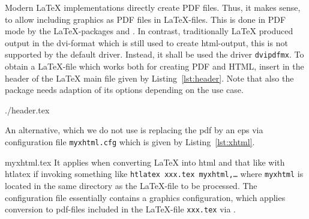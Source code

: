 Modern \LaTeX{} implementations directly create PDF files. 
Thus, it makes sense, 
to allow including graphics as PDF files in \LaTeX-files. 
This is done in PDF mode 
by the \LaTeX-packages  and . 
In contrast, traditionally \LaTeX{} produced output in the \gls{dvi}-format 
which is still used to create \gls{html}-output, 
this is not supported by the default driver. 
Instead, it shall be used the driver \texttt{dvipdfmx}. 
To obtain a \LaTeX-file which works both for creating PDF and HTML, 
insert in the header of the \LaTeX{} main file
given by Listing~\ref{lst:header}. 
Note that also the package  needs adaption of its options 
depending on the use case. 
%

%
%
{./header.tex}%


An alternative, which we do not use 
is replacing the \gls{pdf} by an \gls{eps} via configuration file \texttt{myxhtml.cfg} 
which is given by Listing~\ref{lst:xhtml}. 
%

{myxhtml.tex}
%
It applies when converting \LaTeX{} into html and that like 
with htlatex if invoking something like \texttt{htlatex xxx.tex myxhtml,\ldots} 
where \texttt{myxhtml} is located in the same directory as the \LaTeX-file 
to be processed. 
The configuration file essentially contains a graphics configuration, 
which applies conversion to pdf-files included in the \LaTeX-file \texttt{xxx.tex}
via . 


